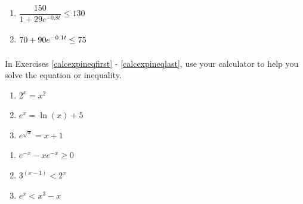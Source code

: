 \begin{multicols}{2} 
\begin{enumerate}
\setcounter{enumi}{\value{HW}}

\item $\dfrac{150}{1 + 29e^{-0.8t}} \leq 130$

\item $\vphantom{\dfrac{150}{1 + 29e^{-0.8t}}} 70 + 90e^{-0.1t} \leq 75$ \label{expineqlast}

\setcounter{HW}{\value{enumi}}
\end{enumerate}
\end{multicols}


In Exercises \ref{calcexpineqfirst} - \ref{calcexpineqlast},  use your calculator to help you solve the equation or  inequality.

\begin{multicols}{3} 
\begin{enumerate}
\setcounter{enumi}{\value{HW}}

\item $2^{x} = x^2$ \label{calcexpineqfirst} 
\item $e^{x} = \ln(x) + 5$   
\item $e^{\sqrt{x}} = x + 1$ 



\setcounter{HW}{\value{enumi}}
\end{enumerate}
\end{multicols}

\begin{multicols}{3} 
\begin{enumerate}
\setcounter{enumi}{\value{HW}}


\item $e^{-x} - xe^{-x} \geq 0$
\item $3^{(x - 1)} < 2^{x}$ 
\item $e^{x} < x^{3} - x$ \label{calcexpineqlast} 


\setcounter{HW}{\value{enumi}}
\end{enumerate}
\end{multicols}


